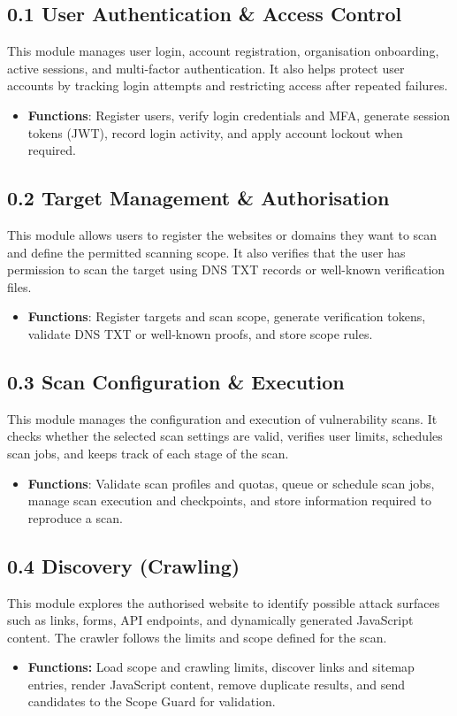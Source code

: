 \documentclass[11pt,a4paper]{article}
\begin{document}
\subsection{0.1 User Authentication \& Access Control}
This module manages user login, account registration, organisation onboarding, active sessions, and multi-factor authentication. It also helps protect user accounts by tracking login attempts and restricting access after repeated failures.
\begin{itemize}[noitemsep]
    \item \textbf{Functions}: Register users, verify login credentials and MFA, generate session tokens (JWT), record login activity, and apply account lockout when required.
\end{itemize}

\subsection{0.2 Target Management \& Authorisation}
This module allows users to register the websites or domains they want to scan and define the permitted scanning scope. It also verifies that the user has permission to scan the target using DNS TXT records or well-known verification files.
\begin{itemize}[noitemsep]
    \item \textbf{Functions}: Register targets and scan scope, generate verification tokens, validate DNS TXT or well-known proofs, and store scope rules.
\end{itemize}

\subsection{0.3 Scan Configuration \& Execution}
This module manages the configuration and execution of vulnerability scans. It checks whether the selected scan settings are valid, verifies user limits, schedules scan jobs, and keeps track of each stage of the scan.
\begin{itemize}[noitemsep]
    \item \textbf{Functions}: Validate scan profiles and quotas, queue or schedule scan jobs, manage scan execution and checkpoints, and store information required to reproduce a scan.
\end{itemize}

\subsection{0.4 Discovery (Crawling)}
This module explores the authorised website to identify possible attack surfaces such as links, forms, API endpoints, and dynamically generated JavaScript content. The crawler follows the limits and scope defined for the scan.
\begin{itemize}[noitemsep]
    \item \textbf{Functions:}\newline
    Load scope and crawling limits, discover links and sitemap entries, render JavaScript content, remove duplicate results, and send candidates to the Scope Guard for validation.
\end{itemize}
\end{document}
